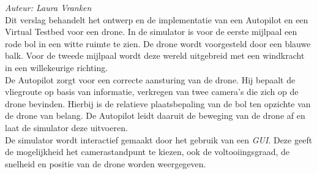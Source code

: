 \noindent
{\em Auteur: Laura Vranken }\\
Dit verslag behandelt het ontwerp en de implementatie van een Autopilot en een Virtual Testbed voor een drone. In de simulator is voor de eerste mijlpaal een rode bol in een witte ruimte te zien. De drone wordt voorgesteld door een blauwe balk. Voor de tweede mijlpaal wordt deze wereld uitgebreid met een windkracht in een willekeurige richting.
\\
De Autopilot zorgt voor een correcte aansturing van de drone. Hij bepaalt de vliegroute op basis van informatie, verkregen van twee camera's die zich op de drone bevinden. Hierbij is de relatieve plaatsbepaling van de bol ten opzichte van de drone van belang. De Autopilot leidt daaruit de beweging van de drone af en laat de simulator deze uitvoeren.
\\
De simulator wordt interactief gemaakt door het gebruik van een \textit{GUI}. Deze geeft de mogelijkheid het camerastandpunt te kiezen, ook de voltooiingsgraad, de snelheid en positie van de drone worden weergegeven.